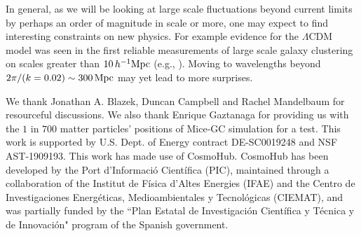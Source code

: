 \documentclass[prd,amsmath,amssymb,floatfix,superscriptaddress,nofootinbib,twocolumn]{revtex4-1}
\begin{document}
In general, as we will be looking at large scale fluctuations beyond current limits by perhaps an order of magnitude in scale or more, one may expect to find interesting constraints on new physics. For example evidence for the $\Lambda$CDM model was seen in the first reliable measurements of large scale galaxy clustering on scales greater than $10\,h^{-1}\rm Mpc$ (e.g., \cite{Efstathio:1990cdm}). Moving to wavelengths beyond $2\pi/(k=0.02) \sim 300 \rm \, Mpc$ may yet lead to more surprises.

\acknowledgements
We thank Jonathan A. Blazek, Duncan Campbell and Rachel Mandelbaum for resourceful discussions. We also thank Enrique Gaztanaga for providing us with the $1$ in $700$ matter particles' positions of Mice-GC simulation for a test. This work is supported by U.S. Dept. of Energy contract DE-SC0019248 and NSF AST-1909193.
This work has made use of CosmoHub. CosmoHub has been developed by the Port d'Informació Científica (PIC), maintained through a collaboration of the Institut de Física d'Altes Energies (IFAE) and the Centro de Investigaciones Energéticas, Medioambientales y Tecnológicas (CIEMAT), and was partially funded by the ``Plan Estatal de Investigación Científica y Técnica y de Innovación" program of the Spanish government.
\clearpage
\end{document}
